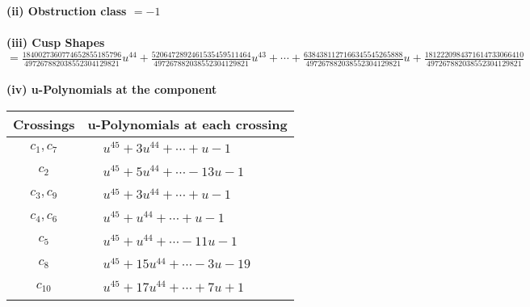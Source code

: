 \documentclass[1p]{elsarticle_modified}
\theoremstyle{definition}
\begin{document}
\flushleft \textbf{(ii) Obstruction class $= -1$}\\~\\
\flushleft \textbf{(iii) Cusp Shapes $= \frac{1840027360774652855185796}{497267882038552304129821} u^{44}+\frac{5206472892461535459511464}{497267882038552304129821} u^{43}+\cdots+\frac{6384381127166345545265888}{497267882038552304129821} u+\frac{1812220984371614733066410}{497267882038552304129821}$}\\~\\
\newpage\renewcommand{\arraystretch}{1}
\flushleft \textbf{(iv) u-Polynomials at the component}\newline \\
\begin{tabular}{m{50pt}|m{274pt}}
Crossings & \hspace{64pt}u-Polynomials at each crossing \\
\hline $$\begin{aligned}c_{1},c_{7}\end{aligned}$$&$\begin{aligned}
&u^{45}+3 u^{44}+\cdots+u-1
\end{aligned}$\\
\hline $$\begin{aligned}c_{2}\end{aligned}$$&$\begin{aligned}
&u^{45}+5 u^{44}+\cdots-13 u-1
\end{aligned}$\\
\hline $$\begin{aligned}c_{3},c_{9}\end{aligned}$$&$\begin{aligned}
&u^{45}+3 u^{44}+\cdots+u-1
\end{aligned}$\\
\hline $$\begin{aligned}c_{4},c_{6}\end{aligned}$$&$\begin{aligned}
&u^{45}+u^{44}+\cdots+u-1
\end{aligned}$\\
\hline $$\begin{aligned}c_{5}\end{aligned}$$&$\begin{aligned}
&u^{45}+u^{44}+\cdots-11 u-1
\end{aligned}$\\
\hline $$\begin{aligned}c_{8}\end{aligned}$$&$\begin{aligned}
&u^{45}+15 u^{44}+\cdots-3 u-19
\end{aligned}$\\
\hline $$\begin{aligned}c_{10}\end{aligned}$$&$\begin{aligned}
&u^{45}+17 u^{44}+\cdots+7 u+1
\end{aligned}$\\
\hline
\end{tabular}\\~\\
\end{document}
